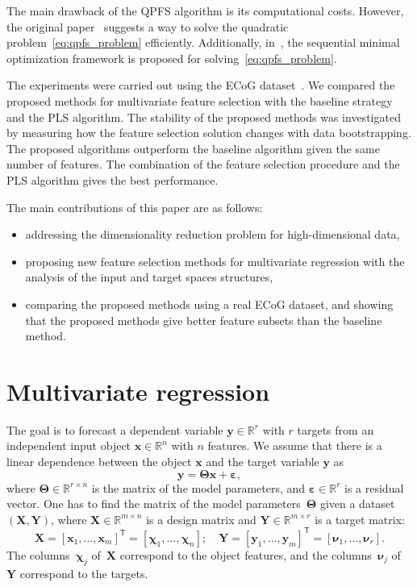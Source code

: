 \documentclass[preprint,12pt]{elsarticle}
\theoremstyle{definition}
\newcommand{\bx}{\mathbf{x}}
\newcommand{\by}{\mathbf{y}}
\newcommand{\bY}{\mathbf{Y}}
\newcommand{\bX}{\mathbf{X}}
\newcommand{\bbR}{\mathbb{R}}
\newcommand{\T}{\mathsf{T}}
\newcommand{\bchi}{\boldsymbol{\chi}}
\newcommand{\bnu}{\boldsymbol{\nu}}
\newcommand{\bTheta}{\boldsymbol{\Theta}}
\begin{document}
The main drawback of the QPFS algorithm is its computational costs. However, the original paper~\cite{rodriguez2010quadratic} suggests a way to solve the quadratic problem~\eqref{eq:qpfs_problem} efficiently. Additionally, in~\cite{prasad2013scaling}, the sequential minimal optimization framework is proposed for solving~\eqref{eq:qpfs_problem}.

The experiments were carried out using the ECoG dataset~\cite{shimoda2012decoding}.
We compared the proposed methods for multivariate feature selection with the baseline strategy and the PLS algorithm. 
The stability of the proposed methods was investigated by measuring how the feature selection solution changes with data bootstrapping.
The proposed algorithms outperform the baseline algorithm given the same number of features. 
The combination of the feature selection procedure and the PLS algorithm gives the best performance.

The main contributions of this paper are as follows:
\begin{itemize}
	\item addressing the dimensionality reduction problem for high-dimensional data,
	\item proposing new feature selection methods for multivariate regression with the analysis of the input and target spaces structures,
	\item comparing the proposed methods using a real ECoG dataset, and showing that the proposed methods give better feature subsets than the baseline method.
\end{itemize}


\section{Multivariate regression}

The goal is to forecast a dependent variable $\by \in \bbR^r$ with $r$ targets from an independent input object $\bx \in \bbR^n$ with $n$ features.
We assume that there is a linear dependence between the object $\bx$ and the target variable $\by$ as
\begin{equation}
\by = \bTheta \bx+ \boldsymbol{\varepsilon},
\label{eq:model}
\end{equation}
where $\bTheta \in \bbR^{r \times n}$ is the matrix of the model parameters, and $\boldsymbol{\varepsilon} \in \bbR^{r}$ is a residual vector.
One has to find the matrix of the model parameters~$\bTheta$ given a dataset $\left( \bX, \bY \right)$, where $\bX \in \bbR^{m \times n}$ is a design matrix and $\bY \in \bbR^{m \times r}$ is a target matrix:
\begin{equation*}
\bX = [\bx_1, \dots, \bx_m]^{\T} =  [\bchi_1, \dots, \bchi_n]; \quad \bY = [\by_1, \dots, \by_m]^{\T} =  [\bnu_1, \dots, \bnu_r].
\end{equation*}
The columns~$\bchi_j$ of~$\bX$ correspond to the object features, and the columns~$\bnu_j$ of~$\bY$ correspond to the targets.
\end{document}
